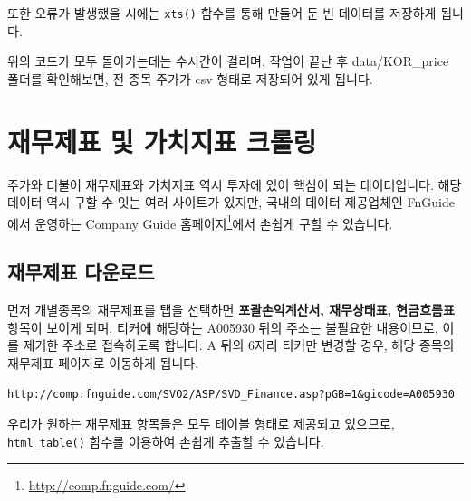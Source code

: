 \documentclass[]{book}
\let\rmarkdownfootnote\footnote%
\def\footnote{\protect\rmarkdownfootnote}
\begin{document}
또한 오류가 발생했을 시에는 \texttt{xts()} 함수를 통해 만들어 둔 빈 데이터를 저장하게 됩니다.

위의 코드가 모두 돌아가는데는 수시간이 걸리며, 작업이 끝난 후 data/KOR\_price 폴더를 확인해보면, 전 종목 주가가 csv 형태로 저장되어 있게 됩니다.

\hypertarget{section-26}{%
\section{재무제표 및 가치지표 크롤링}\label{section-26}}

주가와 더불어 재무제표와 가치지표 역시 투자에 있어 핵심이 되는 데이터입니다. 해당 데이터 역시 구할 수 잇는 여러 사이트가 있지만, 국내의 데이터 제공업체인 FnGuide에서 운영하는 Company Guide 홈페이지\footnote{\url{http://comp.fnguide.com/}}에서 손쉽게 구할 수 있습니다.

\hypertarget{section-27}{%
\subsection{재무제표 다운로드}\label{section-27}}

먼저 개별종목의 재무제표를 탭을 선택하면 \textbf{포괄손익계산서, 재무상태표, 현금흐름표} 항목이 보이게 되며, 티커에 해당하는 A005930 뒤의 주소는 불필요한 내용이므로, 이를 제거한 주소로 접속하도록 합니다. A 뒤의 6자리 티커만 변경할 경우, 해당 종목의 재무제표 페이지로 이동하게 됩니다.

\begin{verbatim}
http://comp.fnguide.com/SVO2/ASP/SVD_Finance.asp?pGB=1&gicode=A005930
\end{verbatim}

우리가 원하는 재무제표 항목들은 모두 테이블 형태로 제공되고 있으므로, \texttt{html\_table()} 함수를 이용하여 손쉽게 추출할 수 있습니다.
\end{document}
